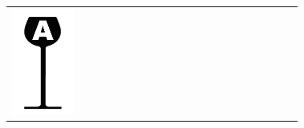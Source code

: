 {\renewcommand{\arraystretch}{1.1}
\begin{center}
\begin{tabular}{ >{\centering\arraybackslash}p{0.18\linewidth}  >{\centering\arraybackslash}p{0.18\linewidth}  >{\centering\arraybackslash}p{0.18\linewidth}  >{\centering\arraybackslash}p{0.18\linewidth}}
\includegraphics[scale=0.021, trim= 0em -5em -5em -5em,]{Icones/icon_alsace_black.pdf}
&

\end{tabular}
\end{center}}
